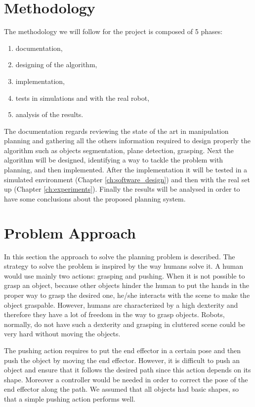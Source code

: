 
\section{Methodology}
The methodology we will follow for the project is composed of 5 phases:
\begin{enumerate}
\item documentation,
\item designing of the algorithm,
\item implementation,
\item tests in simulations and with the real robot,
\item analysis of the results. 
\end{enumerate}
The documentation regards reviewing the state of the art in manipulation planning and gathering all the others information required to design properly the algorithm such as objects segmentation, plane detection, grasping. Next the algorithm will be designed, identifying a way to tackle the problem with planning, and then implemented. After the implementation it will be tested in a simulated environment (Chapter \ref{ch:software_design}) and then 
with the real set up (Chapter \ref{ch:experiments}). Finally the results will be analysed in order to have some conclusions about the proposed planning system. 

\section{Problem Approach}
In this section the approach to solve the planning problem is described. The strategy to solve the problem is inspired by the way humans solve it. A human would use mainly two actions: grasping and pushing. When it is not possible to grasp an object, because other objects hinder the human to put the hands in the proper way to grasp the desired one, he/she interacts with the scene to make the object graspable. However,  humans are characterized by a high dexterity and therefore they have a lot of freedom in the way to grasp objects. Robots, normally, do not have such a dexterity and grasping in cluttered scene could be very hard without moving the objects. 

The pushing action requires to put the end effector in a certain pose and then push the object by moving the end effector. However, it is difficult to push an object and ensure that it follows the desired path since this action depends on its shape. Moreover a controller would be needed in order to correct the pose of the end effector along the path. We assumed that all objects had basic shapes, so that a simple pushing action performs well.

